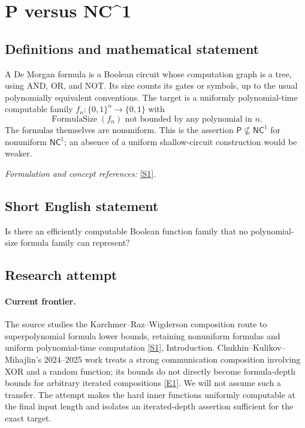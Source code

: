 \documentclass[11pt,a4paper]{article}
\newcommand{\sref}[2]{\hyperlink{source:#1:#2}{[S#2]}}
\newcommand{\eref}[2]{\hyperlink{extra:#1:#2}{[E#2]}}
\newif\ifshowcatalogue
\newcommand{\cataloguescope}[1]{\ifshowcatalogue
 \paragraph{Exact scope in the supplied catalogue.}
 \begin{quote}\small #1\end{quote}\fi}
\numberwithin{equation}{section}
\begin{document}
\setcounter{section}{68}
\clearpage
\section{\texorpdfstring{P versus NC\textasciicircum{}1}{P versus NC\textasciicircum{}1}}\label{69}
\subsection{Definitions and mathematical statement}
A De Morgan formula is a Boolean circuit whose computation graph is a tree, using AND, OR, and NOT. Its size counts its gates or symbols, up to the usual polynomially equivalent conventions. The target is a uniformly polynomial-time computable family $f_n:\{0,1\}^n\to\{0,1\}$ with
\[
 \operatorname{FormulaSize}(f_n)\text{ not bounded by any polynomial in }n.
\]
The formulas themselves are nonuniform. This is the assertion $\mathsf P\nsubseteq\mathsf{NC}^1$ for nonuniform $\mathsf{NC}^1$; an absence of a uniform shallow-circuit construction would be weaker.
\par\smallskip\textit{Formulation and concept references:} \sref{69}{1}.
\cataloguescope{Exhibit a Boolean function family computable in deterministic polynomial time whose nonuniform De Morgan formula size is superpolynomial; equivalently, prove that P is not contained in nonuniform NC\textasciicircum{}1.}
\subsection{Short English statement}
Is there an efficiently computable Boolean function family that no polynomial-size formula family can represent?
\subsection{Research attempt}

\paragraph{Current frontier.}
The source studies the Karchmer--Raz--Wigderson composition route to superpolynomial formula lower bounds, retaining nonuniform formulas and uniform polynomial-time computation \sref{69}{1}, Introduction. Chukhin--Kulikov--Mihajlin's 2024--2025 work treats a strong communication composition involving XOR and a random function; its bounds do not directly become formula-depth bounds for arbitrary iterated compositions \eref{69}{1}. We will not assume such a transfer. The attempt makes the hard inner functions uniformly computable at the final input length and isolates an iterated-depth assertion sufficient for the exact target.
\end{document}
